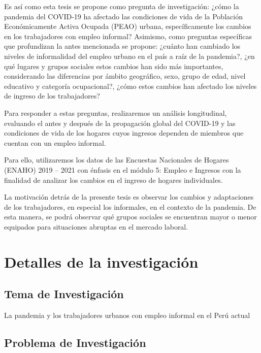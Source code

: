 \documentclass[
  letterpaper,
  12pt,
  oneside,
  spanish,
  doublespacing,
  headsepline,
  parskip]{MastersDoctoralThesis}
\begin{document}
Es así como esta tesis se propone como pregunta de investigación: ¿cómo
la pandemia del COVID-19 ha afectado las condiciones de vida de la
Población Económicamente Activa Ocupada (PEAO) urbana, específicamente
los cambios en los trabajadores con empleo informal? Asimismo, como
preguntas específicas que profundizan la antes mencionada se propone:
¿cuánto han cambiado los niveles de informalidad del empleo urbano en el
país a raíz de la pandemia?, ¿en qué lugares y grupos sociales estos
cambios han sido más importantes, considerando las diferencias por
ámbito geográfico, sexo, grupo de edad, nivel educativo y categoría
ocupacional?, ¿cómo estos cambios han afectado los niveles de ingreso de
los trabajadores?

Para responder a estas preguntas, realizaremos un análisis longitudinal,
evaluando el antes y después de la propagación global del COVID-19 y las
condiciones de vida de los hogares cuyos ingresos dependen de miembros
que cuentan con un empleo informal.

Para ello, utilizaremos los datos de las Encuestas Nacionales de Hogares
(ENAHO) 2019 -- 2021 con énfasis en el módulo 5: Empleo e Ingresos con
la finalidad de analizar los cambios en el ingreso de hogares
individuales.

La motivación detrás de la presente tesis es observar los cambios y
adaptaciones de los trabajadores, en especial los informales, en el
contexto de la pandemia. De esta manera, se podrá observar qué grupos
sociales se encuentran mayor o menor equipados para situaciones abruptas
en el mercado laboral.


\hypertarget{sec-detalles}{%
\chapter{Detalles de la investigación}\label{sec-detalles}}

\hypertarget{tema-de-investigaciuxf3n}{%
\section{Tema de Investigación}\label{tema-de-investigaciuxf3n}}

La pandemia y los trabajadores urbanos con empleo informal en el Perú
actual

\hypertarget{problema-de-investigaciuxf3n}{%
\section{Problema de Investigación}\label{problema-de-investigaciuxf3n}}
\end{document}
